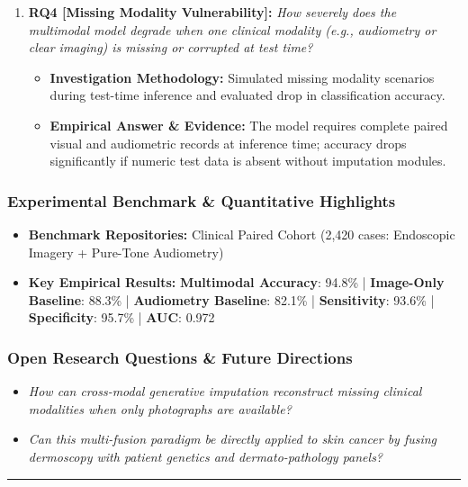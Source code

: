 \begin{enumerate}[label=\textbf{\arabic*.}, leftmargin=*]
\begin{itemize}[leftmargin=1.5em]
    \item \textbf{Empirical Answer \& Evidence:} Attained an overall AUC of 0.972, providing an objective, high-accuracy decision support benchmark for specialized clinical examinations.
  \end{itemize}
  \item \textbf{RQ4 [Missing Modality Vulnerability]:} \textit{How severely does the multimodal model degrade when one clinical modality (e.g., audiometry or clear imaging) is missing or corrupted at test time?}
  \begin{itemize}[leftmargin=1.5em]
    \item \textbf{Investigation Methodology:} Simulated missing modality scenarios during test-time inference and evaluated drop in classification accuracy.
    \item \textbf{Empirical Answer \& Evidence:} The model requires complete paired visual and audiometric records at inference time; accuracy drops significantly if numeric test data is absent without imputation modules.
  \end{itemize}
\end{enumerate}

\subsubsection*{Experimental Benchmark \& Quantitative Highlights}
\begin{itemize}[leftmargin=*]
  \item \textbf{Benchmark Repositories:} Clinical Paired Cohort (2,420 cases: Endoscopic Imagery + Pure-Tone Audiometry)
  \item \textbf{Key Empirical Results:} \textbf{Multimodal Accuracy}: 94.8\% \quad | \quad \textbf{Image-Only Baseline}: 88.3\% \quad | \quad \textbf{Audiometry Baseline}: 82.1\% \quad | \quad \textbf{Sensitivity}: 93.6\% \quad | \quad \textbf{Specificity}: 95.7\% \quad | \quad \textbf{AUC}: 0.972
\end{itemize}

\subsubsection*{Open Research Questions \& Future Directions}
\begin{itemize}[leftmargin=*]
  \item \textit{How can cross-modal generative imputation reconstruct missing clinical modalities when only photographs are available?}
  \item \textit{Can this multi-fusion paradigm be directly applied to skin cancer by fusing dermoscopy with patient genetics and dermato-pathology panels?}
\end{itemize}
\vspace{0.8em}\hrule\vspace{1.2em}

